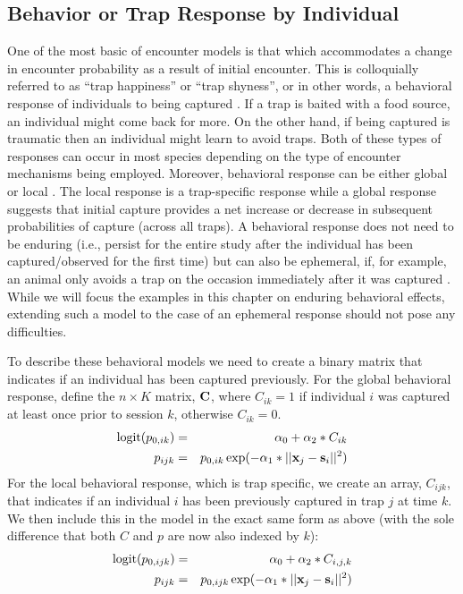 \subsection{Behavior or Trap Response by Individual}
\label{covariates.sec.behavior}

One of the most basic of encounter models is that which accommodates a
change in encounter probability as a result of initial encounter.
This is colloquially referred to as ``trap happiness'' or ``trap shyness'', or in other words, a
behavioral response of individuals to being captured \citep{otis_etal:1978}.
If a trap is baited
with a food source, an individual might come back for
more. On the other hand, if being captured is traumatic then an
individual might learn to avoid traps. Both of these types of
responses can occur in most species depending on the type of encounter
mechanisms being employed. Moreover, behavioral response can be either
global \citep{gardner_etal:2010jwm} or local  \citep{royle_etal:2011jwm}.
The local response is a trap-specific response 
while a global response suggests that initial capture provides a net
increase or decrease in subsequent probabilities of capture (across
all traps). A behavioral response does not need to be enduring (i.e., persist
for the entire study after the individual has been captured/observed
for the first time) but can also be ephemeral, if, for example, an
animal only avoids a trap on the occasion immediately after it was
captured \citep{yang_chao:2005, royle:2008}. While we will focus the
examples in this chapter on enduring behavioral effects, extending
such a model to the case of an ephemeral response should not pose any
difficulties.

To describe these behavioral models we need to create a binary matrix that indicates
if an individual has been captured previously.  For the global
behavioral response, define the $n \times K$ matrix,
${\bf C}$, where $C_{ik} =1$
if individual $i$ was captured at least once prior to session
$k$, otherwise $C_{ik} = 0$.
\begin{eqnarray*}
\mbox{logit}(p_{0,ik})& =& \alpha_{0} + \alpha_{2}*C_{ik} \\
p_{ijk} &= &p_{0,ik} \exp(- \alpha_{1}*||{\bf x}_{j}-{\bf s}_{i}||^2)
\end{eqnarray*}
For the local behavioral response, which is trap specific, we create
an array, $C_{ijk}$, that indicates if an individual $i$ has been
previously captured in trap $j$ at time $k$.  We then include this in
the model in the exact same form as above (with the sole difference that both $C$ and $p$ 
are now also indexed by $k$):
\begin{eqnarray*}
\mbox{logit}(p_{0,ijk}) &= &\alpha_{0} + \alpha_{2}*C_{i,j,k} \\
          p_{ijk} &= &  p_{0,ijk} \exp(- \alpha_{1}*||{\bf x}_{j}-{\bf s}_{i}||^2)
\end{eqnarray*}

